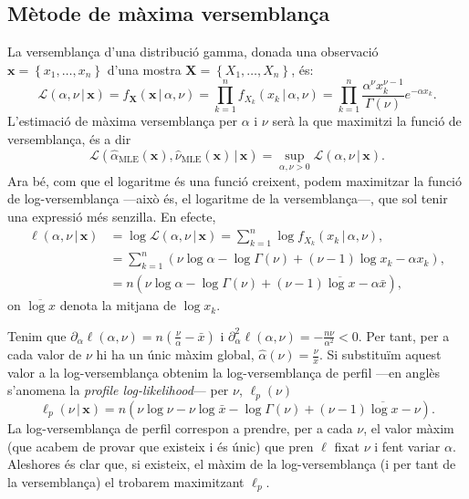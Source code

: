 \documentclass[12pt, catalan]{article}
\numberwithin{table}{section}
\numberwithin{figure}{section}
\numberwithin{equation}{section}
\newcommand{\cond}{\, \vert \,}
\renewcommand{\L}{\mathcal{L}}
\begin{document}
\subsection{Mètode de màxima versemblança}
La versemblança d'una distribució gamma, donada una observació $\mathbf{x} = \left\{x_1, \dots, x_n\right\}$ d'una mostra $\mathbf{X} = \left\{X_1, \dots, X_n\right\}$, és:
\begin{equation*}
    \L(\alpha, \nu \cond \mathbf{x}) = f_{\mathbf{X}}(\mathbf{x} \cond \alpha, \nu) = \prod_{k = 1}^n f_{X_k}(x_k \cond \alpha, \nu) = \prod_{k = 1}^n \frac{\alpha^\nu x_k^{\nu - 1}}{\Gamma(\nu)}  e^{-\alpha x_k}.
\end{equation*}
L'estimació de màxima versemblança per $\alpha$ i $\nu$ serà la que maximitzi la funció de versemblança, és a dir
\begin{equation*}
    \L(\hat{\alpha}_\text{MLE}(\mathbf{x}), \hat{\nu}_\text{MLE}(\mathbf{x}) \cond \mathbf{x}) = \sup_{\alpha, \nu > 0} \L(\alpha, \nu \cond \mathbf{x}).
\end{equation*}
Ara bé, com que el logaritme és una funció creixent, podem maximitzar la funció de log-versemblança ---això és, el logaritme de la versemblança---, que sol tenir una expressió més senzilla. En efecte,
\begin{align}\label{eq:log-likelihood}
     \ell(\alpha, \nu \cond \mathbf{x}) & = \log{\L(\alpha, \nu \cond \mathbf{x})} = \sum_{k = 1}^n \log{f_{X_k}(x_k \cond \alpha, \nu)} \nonumber, \\
     & = \sum_{k = 1}^n (\nu \log{\alpha} - \log{\Gamma(\nu)} + (\nu - 1) \log{x_k} - \alpha x_k) \nonumber, \\
     & = n (\nu \log{\alpha} - \log{\Gamma(\nu)} + (\nu - 1)\overline{\log{x}} - \alpha \bar{x}),
\end{align}
on $\overline{\log{x}}$ denota la mitjana de $\log{x_k}$. 

Tenim que $\partial_\alpha \ell(\alpha, \nu) = n \left(\tfrac{\nu}{\alpha} - \bar{x}\right)$ i $\partial^2_\alpha \ell(\alpha, \nu) = -\tfrac{n\nu}{\alpha^2} < 0$. Per tant, per a cada valor de $\nu$ hi ha un únic màxim global, $\hat{\alpha}(\nu) = \tfrac{\nu}{\bar{x}}$. Si substituïm aquest valor a la log-versemblança obtenim la log-versemblança de perfil ---en anglès s'anomena la \emph{profile log-likelihood}--- per $\nu$, $\ell_p(\nu)$
\begin{equation}\label{eq:profile likelihood}
    \ell_p(\nu \cond \mathbf{x}) = n(\nu \log{\nu} - \nu \log{\bar{x}} - \log{\Gamma(\nu)} + (\nu - 1)\overline{\log{x}} - \nu). 
\end{equation}
La log-versemblança de perfil correspon a prendre, per a cada $\nu$, el valor màxim (que acabem de provar que existeix i és únic) que pren $\ell$ fixat $\nu$ i fent variar $\alpha$. Aleshores és clar que, si existeix, el màxim de la log-versemblança (i per tant de la versemblança) el trobarem maximitzant $\ell_p$. 
\end{document}
